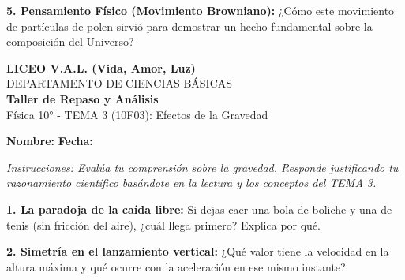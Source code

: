 \documentclass[12pt, letterpaper]{article}
\newif\ifshowanswers
\newcommand{\respAbierta}[2][3cm]{
	\ifshowanswers
	\par\vspace{0.2cm}
	\textbf{\textcolor{blue}{Respuesta Esperada:}} \textcolor{blue}{#2}
	\par\vspace{0.2cm}
	\else
	\par\vspace{#1} %
	\fi
}
\begin{document}
	\vspace{0.2cm}
	\noindent \textbf{5. Pensamiento Físico (Movimiento Browniano):} ¿Cómo este movimiento de partículas de polen sirvió para demostrar un hecho fundamental sobre la composición del Universo?
	\respAbierta[3.5cm]{El movimiento azaroso se explicó como el resultado de choques de moléculas invisibles contra el polen. Esto obligó a la ciencia a aceptar la existencia real de los átomos y moléculas, confirmando que la materia es discreta y no continua.}
	
	\newpage
	\begin{center} 
		{\Large \textbf{LICEO V.A.L. (Vida, Amor, Luz)}}\\[0.1cm] 
		{\large DEPARTAMENTO DE CIENCIAS BÁSICAS}\\[0.1cm] 
		\textbf{Taller de Repaso y Análisis} \\[0.1cm] 
		Física 10° - TEMA 3 (10F03): Efectos de la Gravedad
	\end{center}
	
	\vspace{0.3cm}
	\noindent \textbf{Nombre:} \underline{\hspace{8cm}} \hspace{1cm}\textbf{Fecha:} \underline{\hspace{3cm}}
	
	\vspace{0.3cm}
	\begin{tcolorbox}[colback=gray!10!white, colframe=black, arc=1mm]
		\textit{Instrucciones: Evalúa tu comprensión sobre la gravedad. Responde justificando tu razonamiento científico basándote en la lectura y los conceptos del TEMA 3.}
	\end{tcolorbox}
	
	\vspace{0.3cm}
	\noindent \textbf{1. La paradoja de la caída libre:} Si dejas caer una bola de boliche y una de tenis (sin fricción del aire), ¿cuál llega primero? Explica por qué.
	\respAbierta[3cm]{Ambas llegarán al mismo tiempo. En ausencia de aire, todos los objetos cercanos a la Tierra experimentan la misma aceleración gravitacional ($g \approx 9.8 \text{ m/s}^2$), independientemente de su masa.}
	
	\vspace{0.2cm}
	\noindent \textbf{2. Simetría en el lanzamiento vertical:} ¿Qué valor tiene la velocidad en la altura máxima y qué ocurre con la aceleración en ese mismo instante?
	\respAbierta[3cm]{En la altura máxima, la velocidad es \textbf{cero (0 m/s)}. Sin embargo, la aceleración \textbf{no es cero}; sigue siendo de $9.8 \text{ m/s}^2$ hacia abajo, ya que la gravedad nunca deja de actuar.}
	
\end{document}
